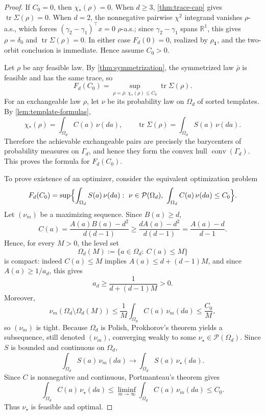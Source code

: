 \documentclass[11pt]{amsart}
\theoremstyle{definition}
\DeclareMathOperator{\tr}{tr}
\DeclareMathOperator{\conv}{conv}
\newcommand{\one}{\mathbf 1}
\newcommand{\R}{\mathbb R}
\newcommand{\cP}{\mathcal P}
\begin{document}
\begin{proof}
If $C_0=0$, then $\chi_*(\rho)=0$. When $d\ge 3$, \cref{thm:trace-cap} gives $\tr\Sigma(\rho)=0$. When $d=2$, the nonnegative pairwise $\chi^2$ integrand vanishes $\rho$-a.s., which forces $(\gamma_2-\gamma_1)^\top x=0$ $\rho$-a.s.; since $\gamma_2-\gamma_1$ spans $\R^1$, this gives $\rho=\delta_0$ and $\tr\Sigma(\rho)=0$. In either case $F_d(0)=0$, realized by $\rho_{\one}$, and the two-orbit conclusion is immediate. Hence assume $C_0>0$.

Let $\rho$ be any feasible law. By \cref{thm:symmetrization}, the symmetrized law $\bar\rho$ is feasible and has the same trace, so
\[
F_d(C_0)=\sup_{\rho=\bar\rho:\,\chi_*(\rho)\le C_0}\tr\Sigma(\rho).
\]
For an exchangeable law $\rho$, let $\nu$ be its probability law on $\Omega_d$ of sorted templates. By \cref{lem:template-formulas},
\[
\chi_*(\rho)=\int_{\Omega_d} C(a)\,\nu(da),
\qquad
\tr\Sigma(\rho)=\int_{\Omega_d} S(a)\,\nu(da).
\]
Therefore the achievable exchangeable pairs are precisely the barycenters of probability measures on $\Gamma_d$, and hence they form the convex hull $\conv(\Gamma_d)$. This proves the formula for $F_d(C_0)$.

To prove existence of an optimizer, consider the equivalent optimization problem
\[
F_d(C_0)=\sup\Bigl\{\int_{\Omega_d} S(a)\,\nu(da):\ \nu\in\cP(\Omega_d),\ \int_{\Omega_d} C(a)\,\nu(da)\le C_0\Bigr\}.
\]
Let $(\nu_m)$ be a maximizing sequence. Since $B(a)\ge d$,
\[
C(a)=\frac{A(a)B(a)-d^2}{d(d-1)}\ge \frac{dA(a)-d^2}{d(d-1)}=\frac{A(a)-d}{d-1}.
\]
Hence, for every $M>0$, the level set
\[
\Omega_d(M):=\{a\in\Omega_d:\ C(a)\le M\}
\]
is compact: indeed $C(a)\le M$ implies $A(a)\le d+(d-1)M$, and since $A(a)\ge 1/a_d$, this gives
\[
a_d\ge \frac{1}{d+(d-1)M}>0.
\]
Moreover,
\[
\nu_m(\Omega_d\setminus \Omega_d(M))\le \frac{1}{M}\int_{\Omega_d} C(a)\,\nu_m(da)\le \frac{C_0}{M},
\]
so $(\nu_m)$ is tight. Because $\Omega_d$ is Polish, Prokhorov's theorem yields a subsequence, still denoted $(\nu_m)$, converging weakly to some $\nu_\star\in\cP(\Omega_d)$. Since $S$ is bounded and continuous on $\Omega_d$,
\[
\int_{\Omega_d} S(a)\,\nu_m(da)\longrightarrow \int_{\Omega_d} S(a)\,\nu_\star(da).
\]
Since $C$ is nonnegative and continuous, Portmanteau's theorem gives
\[
\int_{\Omega_d} C(a)\,\nu_\star(da)\le \liminf_{m\to\infty}\int_{\Omega_d} C(a)\,\nu_m(da)\le C_0.
\]
Thus $\nu_\star$ is feasible and optimal.


\end{proof}
\end{document}
